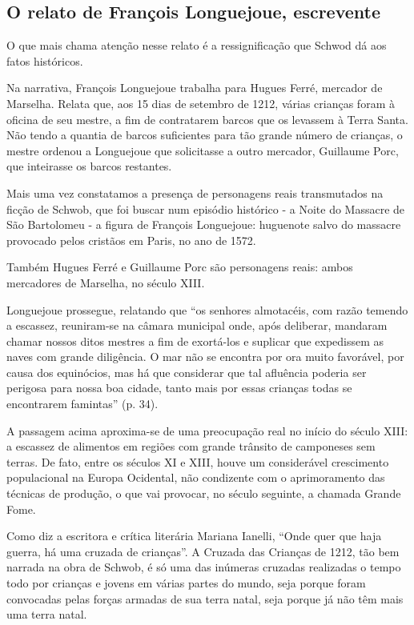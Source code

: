 \documentclass[12pt]{extarticle}
\begin{document}


\subsection{O relato de François Longuejoue, escrevente}

O que mais chama atenção nesse relato é a ressignificação que Schwod dá
aos fatos históricos.

Na narrativa, François Longuejoue trabalha para Hugues Ferré, mercador
de Marselha. Relata que, aos 15 dias de setembro de 1212, várias
crianças foram à oficina de seu mestre, a fim de contratarem barcos que
os levassem à Terra Santa. Não tendo a quantia de barcos suficientes
para tão grande número de crianças, o mestre ordenou a Longuejoue que
solicitasse a outro mercador, Guillaume Porc, que inteirasse os barcos
restantes.

Mais uma vez constatamos a presença de personagens reais transmutados na
ficção de Schwob, que foi buscar num episódio histórico - a Noite do
Massacre de São Bartolomeu -  a figura de François Longuejoue:
huguenote salvo do massacre provocado pelos cristãos em Paris, no ano de
1572.

Também Hugues Ferré e Guillaume Porc são personagens reais: ambos
mercadores de Marselha, no século XIII.

Longuejoue prossegue, relatando que ``os senhores almotacéis, com razão
temendo a escassez, reuniram-se na câmara municipal onde, após
deliberar, mandaram chamar nossos ditos mestres a fim de exortá-los e
suplicar que expedissem as naves com grande diligência. O mar não se
encontra por ora muito favorável, por causa dos equinócios, mas há que
considerar que tal afluência poderia ser perigosa para nossa boa cidade,
tanto mais por essas crianças todas se encontrarem famintas'' (p. 34).

A passagem acima aproxima-se de uma preocupação real no início do século
XIII: a escassez de alimentos em regiões com grande trânsito de
camponeses sem terras. De fato, entre os séculos XI e XIII, houve um
considerável crescimento populacional na Europa Ocidental, não
condizente com o aprimoramento das técnicas de produção, o que vai
provocar, no século seguinte, a chamada Grande Fome.

Como diz a escritora e crítica literária Mariana Ianelli, ``Onde quer
que haja guerra, há uma cruzada de crianças''. A Cruzada das Crianças
de 1212, tão bem narrada na obra de Schwob, é só uma das inúmeras
cruzadas realizadas o tempo todo por crianças e jovens em várias partes
do mundo, seja porque foram convocadas pelas forças armadas de sua terra
natal, seja porque já não têm mais uma terra natal.
\end{document}
